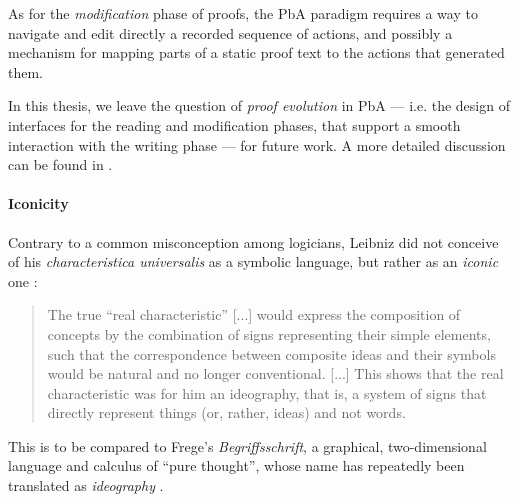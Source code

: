 As for the \emph{modification} phase of proofs, the PbA paradigm requires a way
to navigate and edit directly a recorded sequence of actions, and possibly a
mechanism for mapping parts of a static proof text to the actions that generated
them.

\begin{emphpar}
  In this thesis, we leave the question of \emph{proof evolution} in PbA ---
  i.e. the design of interfaces for the reading and modification phases, that
  support a smooth interaction with the writing phase --- for future work. A
  more detailed discussion can be found in .
\end{emphpar}

\paragraph{Iconicity}


Contrary to a common misconception among logicians, Leibniz did not conceive of
his \textit{characteristica universalis} as a symbolic language, but rather as
an \emph{iconic} one :
\begin{quote}
    The true ``real characteristic'' [...] would express the composition of
    concepts by the combination of signs representing their simple elements,
    such that the correspondence between composite ideas and their symbols would
    be natural and no longer conventional. [...] This shows that the real
    characteristic was for him an ideography, that is, a system of signs that
    directly represent things (or, rather, ideas) and not words.
\end{quote}
This is to be compared to Frege's \textit{Begriffsschrift}, a graphical,
two-dimensional language and calculus of ``pure thought'', whose name has
repeatedly been translated as \emph{ideography}
.

